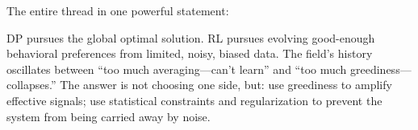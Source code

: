 The entire thread in one powerful statement:

\begin{keyidea}
DP pursues the global optimal solution.
RL pursues evolving good-enough behavioral preferences from limited, noisy, biased data.
The field's history oscillates between ``too much averaging---can't learn'' and ``too much greediness---collapses.''
The answer is not choosing one side, but:
use greediness to amplify effective signals; use statistical constraints and regularization to prevent the system from being carried away by noise.
\end{keyidea}
